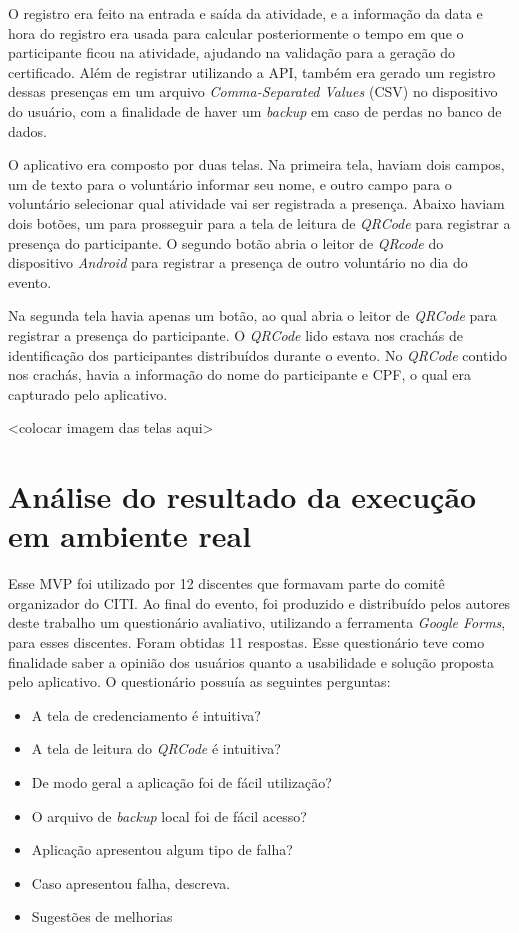 O registro era feito na entrada e saída da atividade, e a informação da data e hora do registro era usada para calcular posteriormente o tempo em que o participante ficou na atividade, ajudando na validação para a geração do certificado. Além de registrar utilizando a API, também era gerado um registro dessas presenças em um arquivo \textit{Comma-Separated Values} (CSV) no dispositivo do usuário, com a finalidade de haver um \textit{backup} em caso de perdas no banco de dados.

O aplicativo era composto por duas telas. Na primeira tela, haviam dois campos, um de texto para o voluntário informar seu nome, e outro campo para o voluntário selecionar qual atividade vai ser registrada a presença. Abaixo haviam dois botões, um para prosseguir para a tela de leitura de \textit{QRCode} para registrar a presença do participante. O segundo botão abria o leitor de \textit{QRcode} do dispositivo \textit{Android} para registrar a presença de outro voluntário no dia do evento.

Na segunda tela havia apenas um botão, ao qual abria o leitor de \textit{QRCode} para registrar a presença do participante. O \textit{QRCode} lido estava nos crachás de identificação dos participantes distribuídos durante o evento. No \textit{QRCode} contido nos crachás, havia a informação do nome do participante e CPF, o qual era capturado pelo aplicativo.

<colocar imagem das telas aqui>

\section{Análise do resultado da execução em ambiente real}

Esse MVP foi utilizado por 12 discentes que formavam parte do comitê organizador do CITI. Ao final do evento, foi produzido e distribuído pelos autores deste trabalho um questionário avaliativo, utilizando a ferramenta \textit{Google Forms}, para esses discentes. Foram obtidas 11 respostas. Esse questionário teve como finalidade saber a opinião dos usuários quanto a usabilidade e solução proposta pelo aplicativo. O questionário possuía as seguintes perguntas:

\begin{itemize}
    \item A tela de credenciamento é intuitiva?
    \item A tela de leitura do \textit{QRCode} é intuitiva?
    \item De modo geral a aplicação foi de fácil utilização?
    \item O arquivo de \textit{backup} local foi de fácil acesso?
    \item Aplicação apresentou algum tipo de falha?
    \item Caso apresentou falha, descreva.
    \item Sugestões de melhorias
\end{itemize}

